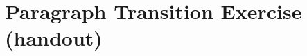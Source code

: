 \documentclass{article}
\begin{document}
\section{Paragraph Transition Exercise (handout)}





\end{document}
